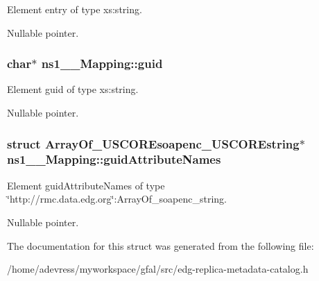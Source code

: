 Element entry of type xs:string. 

Nullable pointer. 
\subsubsection{\setlength{\rightskip}{0pt plus 5cm}char$\ast$ \bf{ns1\_\-\_\-Mapping::guid}}\label{structns1____Mapping_84fc211e929bcde53718bc8e8b4b3686}


Element guid of type xs:string. 

Nullable pointer. 
\subsubsection{\setlength{\rightskip}{0pt plus 5cm}struct \bf{Array\-Of\_\-USCOREsoapenc\_\-USCOREstring}$\ast$ \bf{ns1\_\-\_\-Mapping::guid\-Attribute\-Names}}\label{structns1____Mapping_c53c70829394dd85f68cff7c4f111b42}


Element guid\-Attribute\-Names of type \char`\"{}http://rmc.data.edg.org\char`\"{}:Array\-Of\_\-soapenc\_\-string. 

Nullable pointer. 

The documentation for this struct was generated from the following file:\begin{CompactItemize}
\item 
/home/adevress/myworkspace/gfal/src/edg-replica-metadata-catalog.h\end{CompactItemize}
